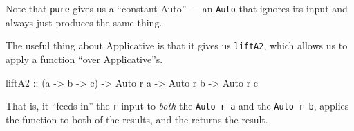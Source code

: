 \documentclass[]{article}
\newenvironment{Shaded}{}{}
\newcommand{\CommentTok}[1]{\textcolor[rgb]{0.38,0.63,0.69}{\textit{#1}}}
\newcommand{\DataTypeTok}[1]{\textcolor[rgb]{0.56,0.13,0.00}{#1}}
\newcommand{\FunctionTok}[1]{\textcolor[rgb]{0.02,0.16,0.49}{#1}}
\newcommand{\KeywordTok}[1]{\textcolor[rgb]{0.00,0.44,0.13}{\textbf{#1}}}
\newcommand{\NormalTok}[1]{#1}
\newcommand{\OperatorTok}[1]{\textcolor[rgb]{0.40,0.40,0.40}{#1}}
\newcommand{\OtherTok}[1]{\textcolor[rgb]{0.00,0.44,0.13}{#1}}
\begin{document}
\begin{Shaded}
\end{Shaded}

Note that \texttt{pure} gives us a ``constant Auto'' --- an \texttt{Auto} that
ignores its input and always just produces the same thing.

The useful thing about Applicative is that it gives us \texttt{liftA2}, which
allows us to apply a function ``over Applicative''s.

\begin{Shaded}
\begin{Highlighting}[]
\OtherTok{liftA2 ::}\NormalTok{ (a }\OtherTok{{-}\textgreater{}}\NormalTok{ b }\OtherTok{{-}\textgreater{}}\NormalTok{ c) }\OtherTok{{-}\textgreater{}} \DataTypeTok{Auto}\NormalTok{ r a }\OtherTok{{-}\textgreater{}} \DataTypeTok{Auto}\NormalTok{ r b }\OtherTok{{-}\textgreater{}} \DataTypeTok{Auto}\NormalTok{ r c}
\end{Highlighting}
\end{Shaded}

That is, it ``feeds in'' the \texttt{r} input to \emph{both} the
\texttt{Auto\ r\ a} and the \texttt{Auto\ r\ b}, applies the function to both of
the results, and the returns the result.
\end{document}
